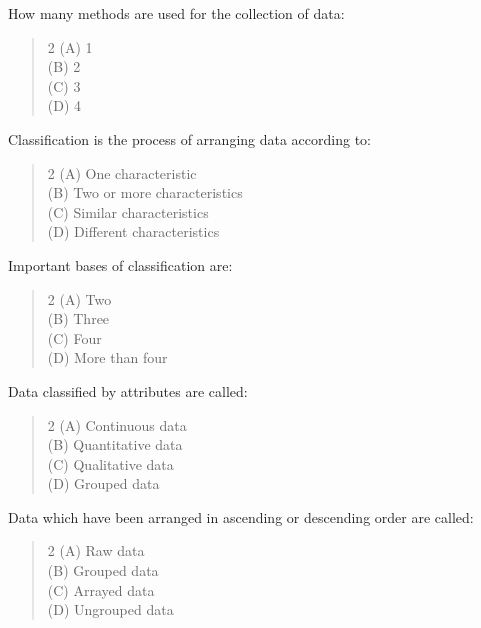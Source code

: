 \documentclass[11pt,a4paper]{article}
\begin{document}
\begin{mcqlist}
\item How many methods are used for the collection of data:
\begin{quote}\begin{multicols}{2}
\noindent (A) 1 \\
(B) 2 \\
(C) 3 \\
(D) 4
\end{multicols}\end{quote}

\item Classification is the process of arranging data according to:
\begin{quote}\begin{multicols}{2}
\noindent (A) One characteristic \\
(B) Two or more characteristics \\
(C) Similar characteristics \\
(D) Different characteristics
\end{multicols}\end{quote}

\item Important bases of classification are:
\begin{quote}\begin{multicols}{2}
\noindent (A) Two \\
(B) Three \\
(C) Four \\
(D) More than four
\end{multicols}\end{quote}

\item Data classified by attributes are called:
\begin{quote}\begin{multicols}{2}
\noindent (A) Continuous data \\
(B) Quantitative data \\
(C) Qualitative data \\
(D) Grouped data
\end{multicols}\end{quote}

\item Data which have been arranged in ascending or descending order are called:
\begin{quote}\begin{multicols}{2}
\noindent (A) Raw data \\
(B) Grouped data \\
(C) Arrayed data \\
(D) Ungrouped data
\end{multicols}\end{quote}


\end{mcqlist}
\end{document}
